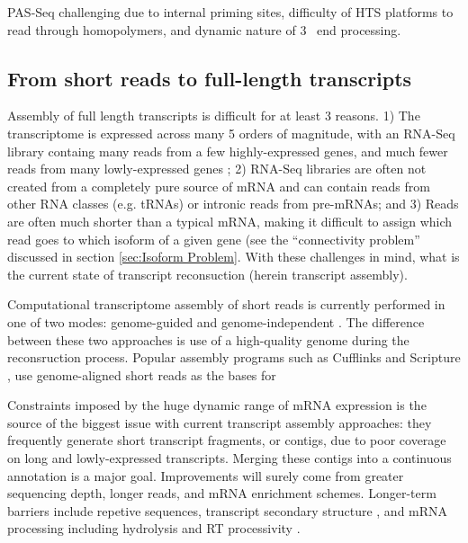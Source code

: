       PAS-Seq challenging due to internal priming sites, difficulty of HTS platforms to read through homopolymers, and dynamic nature of 3\textprime~ end processing.

  \subsection{From short reads to full-length transcripts}\label{subsec: Tx Assembly}

    Assembly of full length transcripts is difficult for at least 3 reasons. 1) The transcriptome is expressed across many 5 orders of magnitude, with an RNA-Seq library containg many reads from a few highly-expressed genes, and much fewer reads from many lowly-expressed genes \citep{Blencowe2009}; 2) RNA-Seq libraries are often not created from a completely pure source of mRNA and can contain reads from other RNA classes (e.g. tRNAs) or intronic reads from pre-mRNAs; and 3) Reads are often much shorter than a typical mRNA, making it difficult to assign which read goes to which isoform of a given gene (see the ``connectivity problem'' discussed in section \ref{sec:Isoform Problem}. With these challenges in mind, what is the current state of transcript reconsuction (herein transcript assembly). 

    Computational transcriptome assembly of short reads is currently performed in one of two modes: genome-guided and genome-independent \citep{Garber2011a}. The difference between these two approaches is use of a high-quality genome during the reconsruction process. Popular assembly programs such as Cufflinks \citep{Trapnell2010} and Scripture \citep{Guttman2010a}, use genome-aligned short reads as the bases for 

    Constraints imposed by the huge dynamic range of mRNA expression is the source of the biggest issue with current transcript assembly approaches: they frequently generate short transcript fragments, or contigs, due to poor coverage on long and lowly-expressed transcripts. Merging these contigs into a continuous annotation is a major goal. Improvements will surely come from greater sequencing depth, longer reads, and mRNA enrichment schemes. Longer-term barriers include repetive sequences, transcript secondary structure \citep{Wan2014}, and mRNA processing including hydrolysis and RT processivity \citep{Sharon2013}. 

